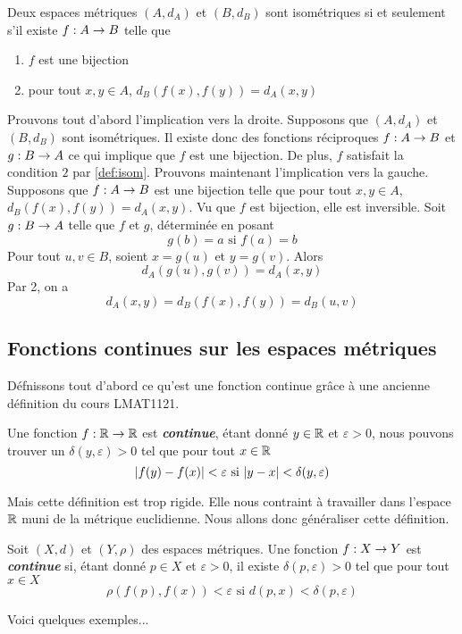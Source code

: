 \documentclass[french]{article}
\begin{document}
\begin{theoreme}
  Deux espaces métriques $(A, d_A)$ et $(B, d_B)$ sont isométriques si et seulement s'il existe $f: A \rightarrow B$ telle que
  \begin{enumerate}
    \item $f$ est une bijection
    \item pour tout $x, y \in A$, $d_B(f(x), f(y)) = d_A(x, y)$
  \end{enumerate}

  \tcblower
  \begin{preuve}
    Prouvons tout d'abord l'implication vers la droite. Supposons que $(A, d_A)$ et $(B, d_B)$ sont isométriques. Il existe donc des fonctions réciproques $f: A \rightarrow B$ et $g: B \rightarrow A$ ce qui implique que $f$ est une bijection. De plus, $f$ satisfait la condition $2$ par \eqref{def:isom}.
    \newline Prouvons maintenant l'implication vers la gauche. Supposons que $f: A \rightarrow B$ est une bijection telle que pour tout $x, y \in A$, $d_B(f(x), f(y)) = d_A(x, y)$. Vu que $f$ est bijection, elle est inversible. Soit $g: B \rightarrow A$ telle que $f$ et $g$, déterminée en posant $$g(b) = a \text{ si  } f(a) = b$$ Pour tout $u, v \in B$, soient $x = g(u)$ et $y = g(v)$. Alors $$d_A(g(u), g(v)) = d_A(x, y)$$
    Par 2, on a $$d_A(x, y) = d_B(f(x), f(y)) = d_B(u, v)$$
  \end{preuve}
\end{theoreme}

\subsection{Fonctions continues sur les espaces métriques}

Défnissons tout d'abord ce qu'est une fonction continue grâce à une ancienne définition du cours LMAT1121.
\begin{definition}[Ancienne]
  Une fonction $f: \mathbb{R} \rightarrow \mathbb{R}$ est \textbf{\it continue}, étant donné $y \in \mathbb{R}$ et $\varepsilon > 0$, nous pouvons trouver un $\delta(y, \varepsilon) > 0$ tel que pour tout $x \in \mathbb{R}$
  $$\lvert f(y) - f(x)\rvert < \varepsilon \text{ si } \lvert y - x\rvert < \delta(y, \varepsilon)$$
\end{definition}
Mais cette définition est trop rigide. Elle nous contraint à travailler dans l'espace $\mathbb{R}$ muni de la métrique euclidienne. Nous allons donc généraliser cette définition.

\begin{definition}[Nouvelle]
  Soit $(X, d)$ et $(Y, \rho)$ des espaces métriques. Une fonction $f: X \rightarrow Y$ est \textbf{\it continue} si, étant donné $p \in X$ et $\varepsilon > 0$, il existe $\delta(p, \varepsilon) > 0$ tel que pour tout $x \in X$
  $$\rho(f(p), f(x)) < \varepsilon \text{ si } d(p, x) < \delta(p, \varepsilon)$$
\end{definition}
Voici quelques exemples...
\end{document}

